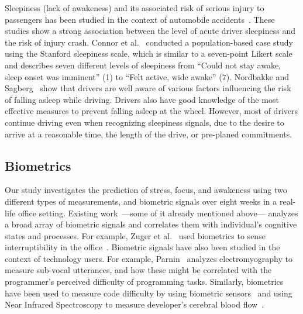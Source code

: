 Sleepiness (lack of awakeness) and its associated risk of serious injury to passengers has been studied in the context of automobile 
accidents~\cite{connor02,Nordbakke07}.
These studies show a strong association between the level of acute driver sleepiness and the risk of injury crash.
Connor et al.~\cite{connor02} conducted a population-based case study using the Stanford sleepiness scale, which is similar to a seven-point Likert scale and describes seven different levels of sleepiness from ``Could not stay awake, sleep onset was imminent'' (1) to ``Felt active, wide awake'' (7).
Nordbakke and Sagberg~\cite{Nordbakke07} show that drivers are well aware of  various factors influencing the risk of falling asleep while driving. Drivers also have good knowledge of the most effective measures to prevent falling asleep at the wheel.
However, most of drivers continue driving even when recognizing sleepiness signals, due to the desire to arrive at a reasonable time, the length of the drive, or pre-planed commitments.


\subsection{Biometrics}
Our study investigates the prediction of stress, focus, and awakeness using two different types of measurements, and biometric signals over eight weeks in a real-life office setting.
Existing work~\cite{sano2013stress,healey2005detecting,wijsman2011towards,zuger2015interruptibility,goyal2017intelligent,Parnin2011,Nakagawa2014,Radevski2015}---some of it already mentioned above--- analyzes a broad array of biometric signals and correlates them with individual's cognitive states and processes.
For example, Zuger et al.~\cite{zuger18} used biometrics to sense interruptibility in the office~\cite{zuger18}.
Biometric signals have also been studied in the context of technology users. For example, Parnin~\cite{Parnin2011} analyzes electromyography to measure sub-vocal utterances, and how these might be correlated with the programmer's perceived difficulty of programming tasks. Similarly, biometrics have been used to measure code difficulty by using biometric sensors~\cite{fritz2014using}
and using Near Infrared Spectroscopy to measure developer's cerebral blood flow~\cite{Nakagawa2014}.

